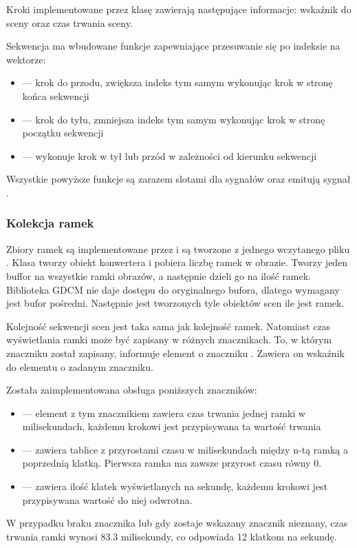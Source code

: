 \par
Kroki implementowane przez klasę  zawierają następujące informacje: wskaźnik do sceny oraz czas trwania sceny.

\par
Sekwencja ma wbudowane funkcje zapewniające przesuwanie się po indeksie na wektorze:
\begin{itemize}
    \item {} --- krok do przodu, zwiększa indeks tym samym wykonując krok w stronę końca sekwencji
    \item {} --- krok do tyłu, zmniejsza indeks tym samym wykonując krok w stronę początku sekwencji
    \item {} --- wykonuje krok w tył lub przód w zależności od kierunku sekwencji
\end{itemize}
Wszystkie powyższe funkcje są zarazem slotami dla sygnałów oraz emitują sygnał .

\subsubsection{Kolekcja ramek \DICOM}
\label{sec:sokar-dicomframeset}

\par
Zbiory ramek są implementowane przez  i są tworzone z jednego wczytanego pliku \DICOM.
Klasa tworzy obiekt konwertera i pobiera liczbę ramek w obrazie.
Tworzy jeden buffor na wszystkie ramki obrazów, a następnie dzieli go na ilość ramek.
Biblioteka GDCM nie daje dostępu do oryginalnego bufora, dlatego wymagany jest bufor pośredni.
Następnie jest tworzonych tyle obiektów scen ile jest ramek.
\par
Kolejność sekwencji scen jest taka sama jak kolejność ramek.
Natomiast czas wyświetlania ramki może być zapisany w różnych znacznikach.
To, w którym znaczniku został zapisany, informuje element o znaczniku .
Zawiera on wskaźnik do elementu o zadanym znaczniku.
\par
Została zaimplementowana obsługa poniższych znaczników:
\begin{itemize}
    \item {} --- element z tym znacznikiem zawiera czas trwania jednej ramki w milisekundach, każdemu krokowi jest przypisywana ta wartość trwania

    \item {} --- zawiera tablice z przyrostami czasu w milisekundach między n-tą ramką a poprzednią klatką. Pierwsza ramka ma zawsze przyrost czasu równy 0.
    
    \item {} --- zawiera ilość klatek wyświetlanych na sekundę, każdemu krokowi jest przypisywana wartość do niej odwrotna.
\end{itemize}
W przypadku braku znacznika lub gdy zostaje wskazany znacznik nieznany, czas trwania ramki wynosi $83.3$ milisekundy, co odpowiada 12 klatkom na sekundę.


